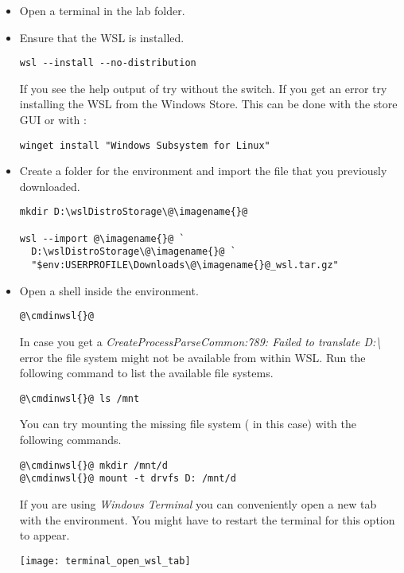 \begin{itemize}
  \item Open a terminal in the lab folder.
  \item Ensure that the WSL is installed.
        \begin{lstlisting}
wsl --install --no-distribution
\end{lstlisting}
        \begin{infobox}
          If you see the help output of  try without the
           switch. If you get an error try installing
          the WSL from the Windows Store. This can be done with the store GUI or
          with :
          \begin{lstlisting}
winget install "Windows Subsystem for Linux"
\end{lstlisting}
        \end{infobox}
  \item Create a folder for the environment and import the file that you previously downloaded.
        \begin{lstlisting}
mkdir D:\wslDistroStorage\@\imagename{}@

wsl --import @\imagename{}@ `
  D:\wslDistroStorage\@\imagename{}@ `
  "$env:USERPROFILE\Downloads\@\imagename{}@_wsl.tar.gz"
\end{lstlisting}
  \item Open a shell inside the environment.

        \begin{lstlisting}
@\cmdinwsl{}@
\end{lstlisting}

        \begin{infobox}
          In case you get a
          \emph{CreateProcessParseCommon:789: Failed to translate D:\textbackslash}
          error the file system might not be available from within WSL.
          Run the following command to list the available file systems.

          \begin{lstlisting}
@\cmdinwsl{}@ ls /mnt
\end{lstlisting}

          You can try mounting the missing file system ( in this case) with
          the following commands.

          \begin{lstlisting}
@\cmdinwsl{}@ mkdir /mnt/d
@\cmdinwsl{}@ mount -t drvfs D: /mnt/d
\end{lstlisting}
        \end{infobox}
        \begin{infobox}
          If you are using \emph{Windows Terminal} you can conveniently open a
          new tab with the environment. You might have to restart the terminal
          for this option to appear.
          \begin{center}
            \texttt{[image: terminal\_open\_wsl\_tab]}
          \end{center}
        \end{infobox}
\end{itemize}

